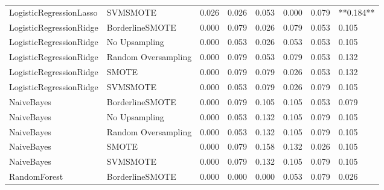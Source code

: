 \begin{tabular}{llllllll}
     LogisticRegressionLasso &            SVMSMOTE & 0.026 &                     0.026 &                 0.053 &                  0.000 &                                   0.079 & **0.184** \\
     LogisticRegressionRidge &     BorderlineSMOTE & 0.000 &                     0.079 &                 0.026 &                  0.079 &                                   0.053 &     0.105 \\
     LogisticRegressionRidge &       No Upsampling & 0.000 &                     0.053 &                 0.026 &                  0.053 &                                   0.053 &     0.105 \\
     LogisticRegressionRidge & Random Oversampling & 0.000 &                     0.079 &                 0.053 &                  0.079 &                                   0.053 &     0.132 \\
     LogisticRegressionRidge &               SMOTE & 0.000 &                     0.079 &                 0.079 &                  0.026 &                                   0.053 &     0.132 \\
     LogisticRegressionRidge &            SVMSMOTE & 0.000 &                     0.053 &                 0.079 &                  0.026 &                                   0.079 &     0.105 \\
                  NaiveBayes &     BorderlineSMOTE & 0.000 &                     0.079 &                 0.105 &                  0.105 &                                   0.053 &     0.079 \\
                  NaiveBayes &       No Upsampling & 0.000 &                     0.053 &                 0.132 &                  0.105 &                                   0.079 &     0.105 \\
                  NaiveBayes & Random Oversampling & 0.000 &                     0.053 &                 0.132 &                  0.105 &                                   0.079 &     0.105 \\
                  NaiveBayes &               SMOTE & 0.000 &                     0.079 &                 0.158 &                  0.132 &                                   0.026 &     0.105 \\
                  NaiveBayes &            SVMSMOTE & 0.000 &                     0.079 &                 0.132 &                  0.105 &                                   0.079 &     0.105 \\
                RandomForest &     BorderlineSMOTE & 0.000 &                     0.000 &                 0.000 &                  0.053 &                                   0.079 &     0.026 \\

\end{tabular}
